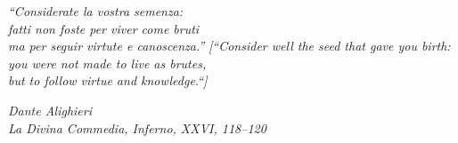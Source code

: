 \pagestyle{empty}  %

\null\vfill
\textit{``Considerate la vostra semenza: \\ fatti non foste per viver come bruti \\ ma per seguir virtute e canoscenza.''} \newline
\indent \textit{[``Consider well the seed that gave you birth: \\ you were not made to live as brutes, \\ but to follow virtue and knowledge.``]}

\begin{flushright}
\textit{Dante Alighieri} \\
\textit{La Divina Commedia, Inferno, XXVI, 118--120}
\end{flushright}

\vfill\vfill\vfill\vfill\vfill\vfill\null
\clearpage  %
